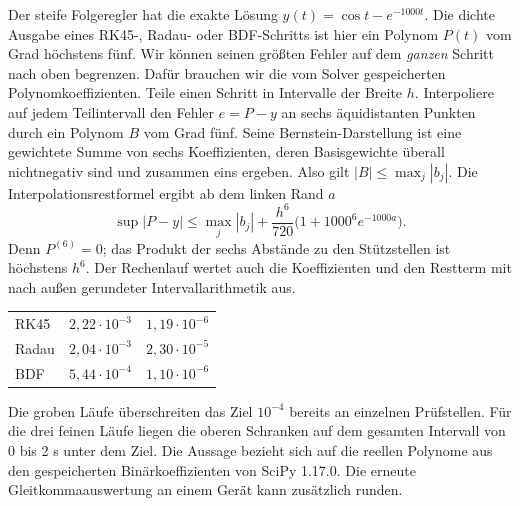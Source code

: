 Der steife Folgeregler hat die exakte Lösung \(y(t)=\cos t-e^{-1000t}\). Die dichte Ausgabe eines RK45-, Radau- oder BDF-Schritts ist hier ein Polynom \(P(t)\) vom Grad höchstens fünf. Wir können seinen größten Fehler auf dem \emph{ganzen} Schritt nach oben begrenzen. Dafür brauchen wir die vom Solver gespeicherten Polynomkoeffizienten.
Teile einen Schritt in Intervalle der Breite \(h\). Interpoliere auf jedem Teilintervall den Fehler \(e=P-y\) an sechs äquidistanten Punkten durch ein Polynom \(B\) vom Grad fünf. Seine Bernstein-Darstellung ist eine gewichtete Summe von sechs Koeffizienten, deren Basisgewichte überall nichtnegativ sind und zusammen eins ergeben. Also gilt \(|B|\le\max_j |b_j|\). Die Interpolationsrestformel ergibt ab dem linken Rand \(a\)
\[
 \sup |P-y|\le \max_j|b_j|+
             \frac{h^6}{720}\bigl(1+1000^6e^{-1000a}\bigr).
\]
Denn \(P^{(6)}=0\); das Produkt der sechs Abstände zu den Stützstellen ist höchstens \(h^6\). Der Rechenlauf wertet auch die Koeffizienten und den Restterm mit nach außen gerundeter Intervallarithmetik aus.
{\tblstart\begin{tabularx}{\linewidth}{@{}Yrr@{}}\toprule
{}&&\\\midrule
RK45&\(2{,}22\cdot10^{-3}\)&\(1{,}19\cdot10^{-6}\)\\
Radau&\(2{,}04\cdot10^{-3}\)&\(2{,}30\cdot10^{-5}\)\\
BDF&\(5{,}44\cdot10^{-4}\)&\(1{,}10\cdot10^{-6}\)\\\bottomrule\end{tabularx}\par}
Die groben Läufe überschreiten das Ziel \(10^{-4}\) bereits an einzelnen Prüfstellen. Für die drei feinen Läufe liegen die oberen Schranken auf dem gesamten Intervall von 0 bis 2 s unter dem Ziel. Die Aussage bezieht sich auf die reellen Polynome aus den gespeicherten Binärkoeffizienten von SciPy 1.17.0. Die erneute Gleitkommaauswertung an einem Gerät kann zusätzlich runden.

